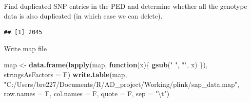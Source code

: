 \documentclass[]{article}
\newenvironment{Shaded}{\begin{snugshade}}{\end{snugshade}}
\newcommand{\KeywordTok}[1]{\textcolor[rgb]{0.13,0.29,0.53}{\textbf{#1}}}
\newcommand{\DataTypeTok}[1]{\textcolor[rgb]{0.13,0.29,0.53}{#1}}
\newcommand{\CharTok}[1]{\textcolor[rgb]{0.31,0.60,0.02}{#1}}
\newcommand{\StringTok}[1]{\textcolor[rgb]{0.31,0.60,0.02}{#1}}
\newcommand{\CommentTok}[1]{\textcolor[rgb]{0.56,0.35,0.01}{\textit{#1}}}
\newcommand{\ControlFlowTok}[1]{\textcolor[rgb]{0.13,0.29,0.53}{\textbf{#1}}}
\newcommand{\OperatorTok}[1]{\textcolor[rgb]{0.81,0.36,0.00}{\textbf{#1}}}
\newcommand{\NormalTok}[1]{#1}
\begin{document}
Find duplicated SNP entries in the PED and determine whether all the
genotype data is also duplicated (in which case we can delete).

\begin{Shaded}
\end{Shaded}

\begin{verbatim}
## [1] 2045
\end{verbatim}

\begin{Shaded}
\end{Shaded}

Write map file

\begin{Shaded}
\begin{Highlighting}[]
\NormalTok{map <-}\StringTok{ }\KeywordTok{data.frame}\NormalTok{(}\KeywordTok{lapply}\NormalTok{(map, }\ControlFlowTok{function}\NormalTok{(x)\{}
  \KeywordTok{gsub}\NormalTok{(}\StringTok{" "}\NormalTok{, }\StringTok{""}\NormalTok{, x)}
\NormalTok{\}), }\DataTypeTok{stringsAsFactors =}\NormalTok{ F)}
\KeywordTok{write.table}\NormalTok{(map, }\StringTok{"C:/Users/bre227/Documents/R/AD_project/Working/plink/snp_data.map"}\NormalTok{, }\DataTypeTok{row.names =}\NormalTok{ F, }\DataTypeTok{col.names =}\NormalTok{ F, }\DataTypeTok{quote =}\NormalTok{ F, }\DataTypeTok{sep =} \StringTok{"}\CharTok{\textbackslash{}t}\StringTok{"}\NormalTok{)}
\end{Highlighting}
\end{Shaded}
\end{document}
